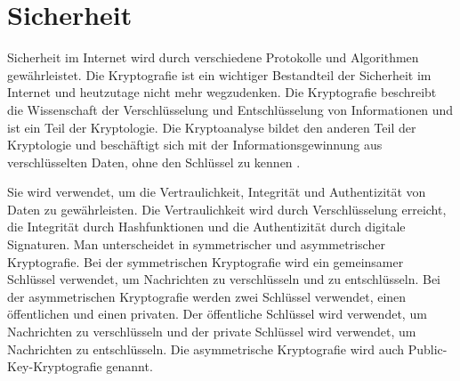 \section{Sicherheit}
\label{sec:sicherheit_basics}

Sicherheit im Internet wird durch verschiedene Protokolle und Algorithmen gewährleistet. Die Kryptografie ist ein wichtiger Bestandteil der Sicherheit im Internet und heutzutage nicht mehr wegzudenken. Die Kryptografie beschreibt die Wissenschaft der Verschlüsselung und Entschlüsselung von Informationen und ist ein Teil der Kryptologie. Die Kryptoanalyse bildet den anderen Teil der Kryptologie und beschäftigt sich mit der Informationsgewinnung aus verschlüsselten Daten, ohne den Schlüssel zu kennen \Parencite[S. 21]{Ertel_AngewandteKryptographie}.


Sie wird verwendet, um die Vertraulichkeit, Integrität und Authentizität von Daten zu gewährleisten. Die Vertraulichkeit wird durch Verschlüsselung erreicht, die Integrität durch Hashfunktionen und die Authentizität durch digitale Signaturen. Man unterscheidet in symmetrischer und asymmetrischer Kryptografie. Bei der symmetrischen Kryptografie wird ein gemeinsamer Schlüssel verwendet, um Nachrichten zu verschlüsseln und zu entschlüsseln. Bei der asymmetrischen Kryptografie werden zwei Schlüssel verwendet, einen öffentlichen und einen privaten. Der öffentliche Schlüssel wird verwendet, um Nachrichten zu verschlüsseln und der private Schlüssel wird verwendet, um Nachrichten zu entschlüsseln. Die asymmetrische Kryptografie wird auch Public-Key-Kryptografie genannt.

